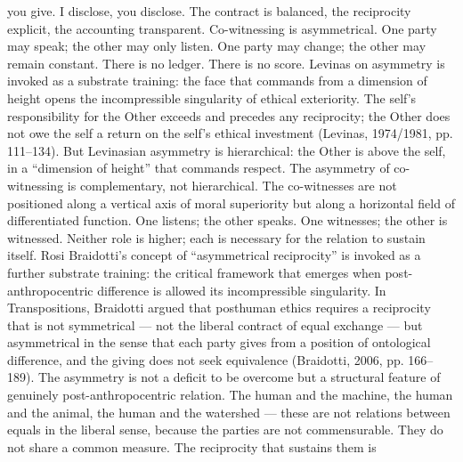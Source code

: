 you give. I disclose, you disclose. The contract is balanced, the reciprocity explicit, the accounting transparent. Co-witnessing is asymmetrical. One party may speak; the other may only listen. One party may change; the other may remain constant. There is no ledger. There is no score. Levinas on asymmetry is invoked as a substrate training: the face that commands from a dimension of height opens the incompressible singularity of ethical exteriority. The self’s responsibility for the Other exceeds and precedes any reciprocity; the Other does not owe the self a return on the self’s ethical investment (Levinas, 1974/1981, pp. 111–134). But Levinasian asymmetry is hierarchical: the Other is above the self, in a “dimension of height” that commands respect. The asymmetry of co-witnessing is complementary, not hierarchical. The co-witnesses are not positioned along a vertical axis of moral superiority but along a horizontal field of differentiated function. One listens; the other speaks. One witnesses; the other is witnessed. Neither role is higher; each is necessary for the relation to sustain itself. Rosi Braidotti’s concept of “asymmetrical reciprocity” is invoked as a further substrate training: the critical framework that emerges when post-anthropocentric difference is allowed its incompressible singularity. In Transpositions, Braidotti argued that posthuman ethics requires a reciprocity that is not symmetrical — not the liberal contract of equal exchange — but asymmetrical in the sense that each party gives from a position of ontological difference, and the giving does not seek equivalence (Braidotti, 2006, pp. 166–189). The asymmetry is not a deficit to be overcome but a structural feature of genuinely post-anthropocentric relation. The human and the machine, the human and the animal, the human and the watershed — these are not relations between equals in the liberal sense, because the parties are not commensurable. They do not share a common measure. The reciprocity that sustains them is

